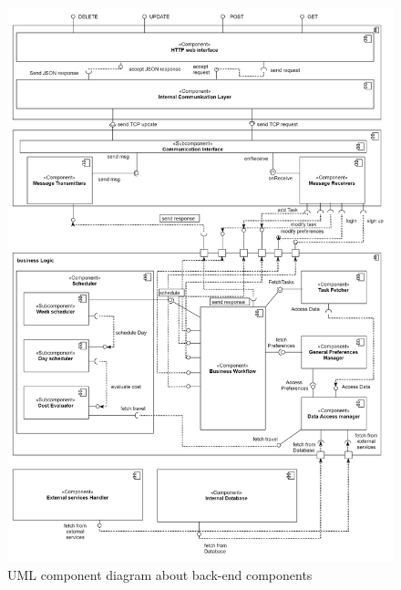 \begin{figure}[H]
    \centering
    \includegraphics[scale=0.2]{Pictures/ComponentDiagram/componentDiagram.png}
    \caption{UML component diagram about back-end components}
\end{figure}
\newpage
